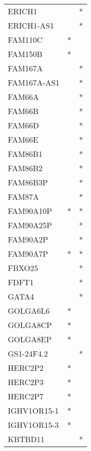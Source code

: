 \begin{longtable}{lcc}
ERICH1       &                &          * \\
ERICH1-AS1   &                &          * \\
FAM110C      &              * &            \\
FAM150B      &              * &            \\
FAM167A      &                &          * \\
FAM167A-AS1  &                &          * \\
FAM66A       &                &          * \\
FAM66B       &                &          * \\
FAM66D       &                &          * \\
FAM66E       &                &          * \\
FAM86B1      &                &          * \\
FAM86B2      &                &          * \\
FAM86B3P     &                &          * \\
FAM87A       &                &          * \\
FAM90A10P    &              * &          * \\
FAM90A25P    &                &          * \\
FAM90A2P     &                &          * \\
FAM90A7P     &              * &          * \\
FBXO25       &                &          * \\
FDFT1        &                &          * \\
GATA4        &                &          * \\
GOLGA6L6     &              * &            \\
GOLGA8CP     &              * &            \\
GOLGA8EP     &              * &            \\
GS1-24F4.2   &                &          * \\
HERC2P2      &              * &            \\
HERC2P3      &              * &            \\
HERC2P7      &              * &            \\
IGHV1OR15-1  &              * &            \\
IGHV1OR15-3  &              * &            \\
KBTBD11      &                &          * \\

\end{longtable}
